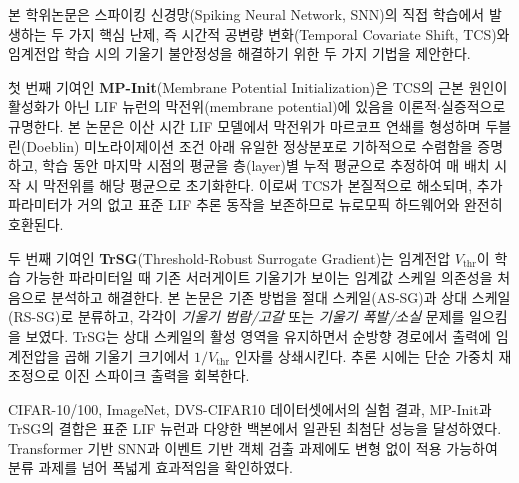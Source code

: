
본 학위논문은 스파이킹 신경망(Spiking Neural Network, SNN)의 직접 학습에서 발생하는 두 가지 핵심 난제, 즉 시간적 공변량 변화(Temporal Covariate Shift, TCS)와 임계전압 학습 시의 기울기 불안정성을 해결하기 위한 두 가지 기법을 제안한다.

첫 번째 기여인 \textbf{MP-Init}(Membrane Potential Initialization)은 TCS의 근본 원인이 활성화가 아닌 LIF 뉴런의 막전위(membrane potential)에 있음을 이론적$\cdot$실증적으로 규명한다. 본 논문은 이산 시간 LIF 모델에서 막전위가 마르코프 연쇄를 형성하며 두블린(Doeblin) 미노라이제이션 조건 아래 유일한 정상분포로 기하적으로 수렴함을 증명하고, 학습 동안 마지막 시점의 평균을 층(layer)별 누적 평균으로 추정하여 매 배치 시작 시 막전위를 해당 평균으로 초기화한다. 이로써 TCS가 본질적으로 해소되며, 추가 파라미터가 거의 없고 표준 LIF 추론 동작을 보존하므로 뉴로모픽 하드웨어와 완전히 호환된다.

두 번째 기여인 \textbf{TrSG}(Threshold-Robust Surrogate Gradient)는 임계전압 $V_{\text{thr}}$이 학습 가능한 파라미터일 때 기존 서러게이트 기울기가 보이는 임계값 스케일 의존성을 처음으로 분석하고 해결한다. 본 논문은 기존 방법을 절대 스케일(AS-SG)과 상대 스케일(RS-SG)로 분류하고, 각각이 \emph{기울기 범람/고갈} 또는 \emph{기울기 폭발/소실} 문제를 일으킴을 보였다. TrSG는 상대 스케일의 활성 영역을 유지하면서 순방향 경로에서 출력에 임계전압을 곱해 기울기 크기에서 $1/V_{\text{thr}}$ 인자를 상쇄시킨다. 추론 시에는 단순 가중치 재조정으로 이진 스파이크 출력을 회복한다.

CIFAR-10/100, ImageNet, DVS-CIFAR10 데이터셋에서의 실험 결과, MP-Init과 TrSG의 결합은 표준 LIF 뉴런과 다양한 백본에서 일관된 최첨단 성능을 달성하였다. Transformer 기반 SNN과 이벤트 기반 객체 검출 과제에도 변형 없이 적용 가능하여 분류 과제를 넘어 폭넓게 효과적임을 확인하였다.
